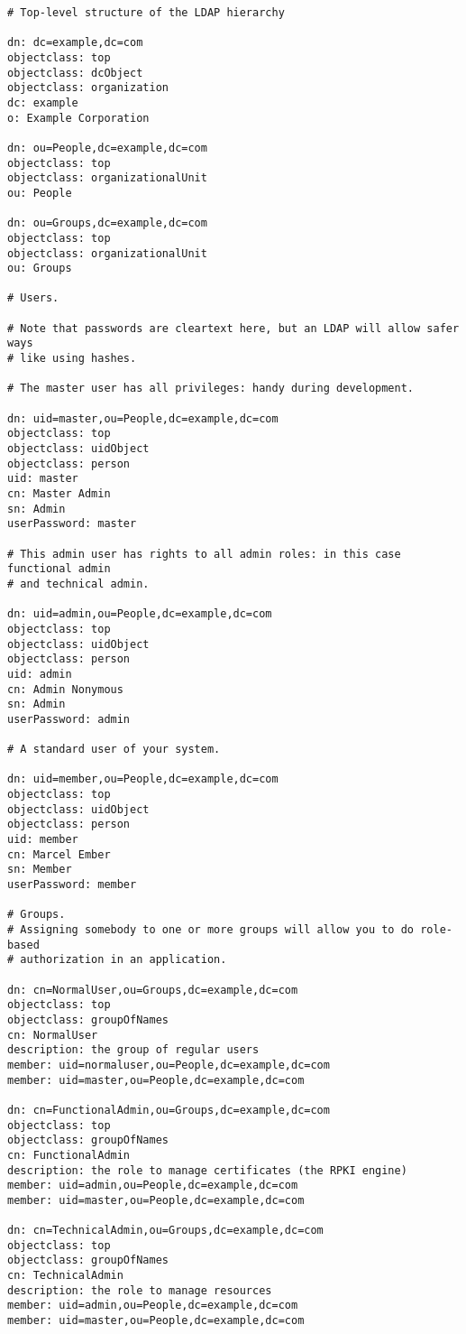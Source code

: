 \begin{enumerate}
\begin{lstlisting}
# Top-level structure of the LDAP hierarchy

dn: dc=example,dc=com
objectclass: top
objectclass: dcObject
objectclass: organization
dc: example
o: Example Corporation

dn: ou=People,dc=example,dc=com
objectclass: top
objectclass: organizationalUnit
ou: People

dn: ou=Groups,dc=example,dc=com
objectclass: top
objectclass: organizationalUnit
ou: Groups

# Users.

# Note that passwords are cleartext here, but an LDAP will allow safer ways
# like using hashes.

# The master user has all privileges: handy during development.

dn: uid=master,ou=People,dc=example,dc=com
objectclass: top
objectclass: uidObject
objectclass: person
uid: master
cn: Master Admin
sn: Admin
userPassword: master

# This admin user has rights to all admin roles: in this case functional admin
# and technical admin.

dn: uid=admin,ou=People,dc=example,dc=com
objectclass: top
objectclass: uidObject
objectclass: person
uid: admin
cn: Admin Nonymous
sn: Admin
userPassword: admin

# A standard user of your system.

dn: uid=member,ou=People,dc=example,dc=com
objectclass: top
objectclass: uidObject
objectclass: person
uid: member
cn: Marcel Ember
sn: Member
userPassword: member

# Groups. 
# Assigning somebody to one or more groups will allow you to do role-based
# authorization in an application.

dn: cn=NormalUser,ou=Groups,dc=example,dc=com
objectclass: top
objectclass: groupOfNames
cn: NormalUser
description: the group of regular users
member: uid=normaluser,ou=People,dc=example,dc=com
member: uid=master,ou=People,dc=example,dc=com

dn: cn=FunctionalAdmin,ou=Groups,dc=example,dc=com
objectclass: top
objectclass: groupOfNames
cn: FunctionalAdmin
description: the role to manage certificates (the RPKI engine)
member: uid=admin,ou=People,dc=example,dc=com
member: uid=master,ou=People,dc=example,dc=com

dn: cn=TechnicalAdmin,ou=Groups,dc=example,dc=com
objectclass: top
objectclass: groupOfNames
cn: TechnicalAdmin
description: the role to manage resources
member: uid=admin,ou=People,dc=example,dc=com
member: uid=master,ou=People,dc=example,dc=com
\end{lstlisting}
	\end{enumerate}

